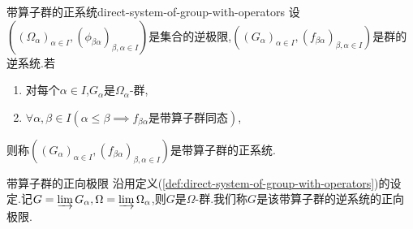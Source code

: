 \begin{definition}{带算子群的正系统}{direct-system-of-group-with-operators}
	设$\left(\left(\Omega_{\alpha}\right)_{\alpha\in I},\left(\phi_{\beta\alpha}\right)_{\beta,\alpha\in I}\right)$是集合的逆极限,$\left(\left(G_{\alpha}\right)_{\alpha\in I},\left(f_{\beta\alpha}\right)_{\beta,\alpha\in I}\right)$是群的逆系统.若
	\begin{enumerate}
		\item 对每个$\alpha\in I$,$G_{\alpha}$是$\Omega_{\alpha}$-群,
		\item $\forall\alpha,\beta\in I\left(\alpha\leq\beta\implies f_{\beta\alpha}\text{是带算子群同态}\right)$,
	\end{enumerate}
	则称$\left(\left(G_{\alpha}\right)_{\alpha\in I},\left(f_{\beta\alpha}\right)_{\beta,\alpha\in I}\right)$是带算子群的正系统.
\end{definition}

\begin{definition}{带算子群的正向极限}{}
	沿用定义(\ref{def:direct-system-of-group-with-operators})的设定.记$G=\varinjlim G_{\alpha},\Omega=\varinjlim\Omega_{\alpha}$,则$G$是$\Omega$-群.我们称$G$是该带算子群的逆系统的正向极限.
\end{definition}